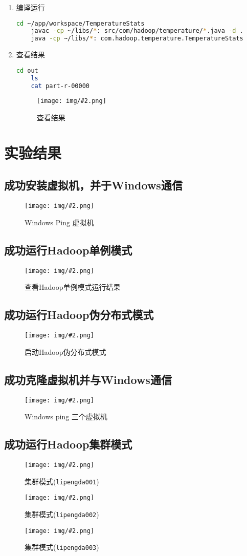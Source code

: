 \documentclass{article}
\newenvironment{enum}{
    \begin{enumerate}[label=(\arabic*), noitemsep]
}{
    \end{enumerate}
}
\newcommand{\img}[3][0.9]{%
    \begin{figure}[H]
        \centering
        \texttt{[image: img/\#2.png]}
        \caption{#3}
    \end{figure}
}
\begin{document}
\begin{enum}
\begin{lstlisting}[language=java]
            System.exit(job.waitForCompletion(true) ? 0 : 1);
        }
    }
    \end{lstlisting}
    
    \item 编译运行
    
    \begin{lstlisting}[language=bash]
    cd ~/app/workspace/TemperatureStats
    javac -cp ~/libs/*: src/com/hadoop/temperature/*.java -d .
    java -cp ~/libs/*: com.hadoop.temperature.TemperatureStats
    \end{lstlisting}
    
    \item 查看结果
    
    \begin{lstlisting}[language=bash]
    cd out
    ls
    cat part-r-00000
    \end{lstlisting}
    
    \img{8.3.1}{查看结果}
    
    \end{enum}
    

\section{实验结果}

\subsection{成功安装虚拟机，并于Windows通信}
\img{0.1.2.4.4}{Windows Ping 虚拟机}

\subsection{成功运行Hadoop单例模式}
\img{0.2.3.4.2}{查看Hadoop单例模式运行结果}

\subsection{成功运行Hadoop伪分布式模式}
\img{0.3.2.2.1}{启动Hadoop伪分布式模式}

\subsection{成功克隆虚拟机并与Windows通信}
\img{4.2.4}{Windows ping 三个虚拟机}

\subsection{成功运行Hadoop集群模式}
\img{7.2.3.7}{集群模式(\texttt{lipengda001})}
\img{7.2.3.8}{集群模式(\texttt{lipengda002})}
\img{7.2.3.9}{集群模式(\texttt{lipengda003})}
\end{document}

